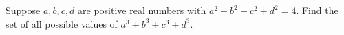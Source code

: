 Suppose $a,b,c,d$ are positive real numbers with $a^2+b^2+c^2+d^2=4$. Find the set of all possible values of $a^3+b^3+c^3+d^3$.
